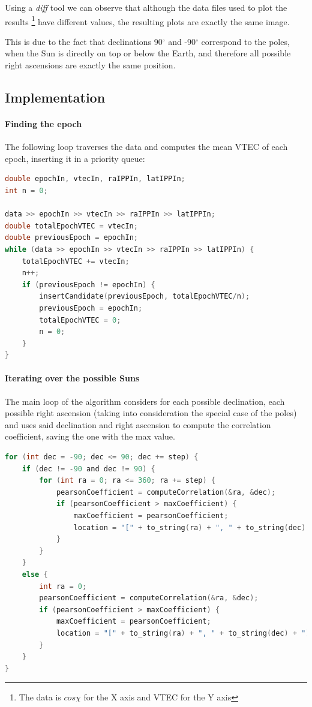 Using a \textit{diff} tool we can observe that although the data files used to plot the results \footnote{The data is $cos\chi$ for the X axis and VTEC for the Y axis} have different values, the resulting plots are exactly the same image.

This is due to the fact that declinations 90$^{\circ}$ and -90$^{\circ}$ correspond to the poles, when the Sun is directly on top or below the Earth, and therefore all possible right ascensions are exactly the same position.

\subsection{Implementation}

\paragraph{Finding the epoch}

The following loop traverses the data and computes the mean VTEC of each epoch, inserting it in a priority queue:

\begin{minipage}{\linewidth}
\begin{lstlisting}[language=c, caption=Finding a VTEC spike]
double epochIn, vtecIn, raIPPIn, latIPPIn;
int n = 0;

data >> epochIn >> vtecIn >> raIPPIn >> latIPPIn;
double totalEpochVTEC = vtecIn;
double previousEpoch = epochIn;
while (data >> epochIn >> vtecIn >> raIPPIn >> latIPPIn) {
	totalEpochVTEC += vtecIn;
	n++;
	if (previousEpoch != epochIn) {
		insertCandidate(previousEpoch, totalEpochVTEC/n);
		previousEpoch = epochIn;
		totalEpochVTEC = 0;
		n = 0;
	}
}
\end{lstlisting}
\end{minipage}


\paragraph{Iterating over the possible Suns}

The main loop of the algorithm considers for each possible declination, each possible right ascension (taking into consideration the special case of the poles) and uses said declination and right ascension to compute the correlation coefficient, saving the one with the max value.

\begin{minipage}{\linewidth}
\begin{lstlisting}[language=c, caption=Main loops]
for (int dec = -90; dec <= 90; dec += step) {
	if (dec != -90 and dec != 90) {
		for (int ra = 0; ra <= 360; ra += step) {
			pearsonCoefficient = computeCorrelation(&ra, &dec);
			if (pearsonCoefficient > maxCoefficient) {
				maxCoefficient = pearsonCoefficient;
				location = "[" + to_string(ra) + ", " + to_string(dec) + "]";
			}
		}
	}
	else {
		int ra = 0;
		pearsonCoefficient = computeCorrelation(&ra, &dec);
		if (pearsonCoefficient > maxCoefficient) {
			maxCoefficient = pearsonCoefficient;
			location = "[" + to_string(ra) + ", " + to_string(dec) + "]";
		}
	}
}
\end{lstlisting}
\end{minipage}

